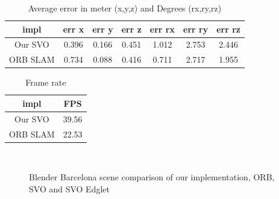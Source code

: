 \documentclass[11pt,a4paper,titlepage,oneside]{report}
\begin{document}
\begin{table}[H]
  \centering
  \begin{tabular}{|c|c|c|c|c|c|c|}
    impl & err x & err y & err z & err rx & err ry & err rz\\
    \hline
    Our SVO & 0.396 & 0.166 & 0.451 & 1.012 & 2.753 & 2.446\\
    ORB SLAM & 0.734 & 0.088 & 0.416 & 0.711 & 2.717 & 1.955
  \end{tabular}
\caption{Average error in meter (x,y,z) and Degrees (rx,ry,rz)}
\label{tab:barcelona_average}
\end{table}

\begin{table}[H]
  \centering
  \begin{tabular}{|c|c|}
  impl & FPS\\
  \hline
  Our SVO & 39.56\\
  ORB SLAM & 22.53
\end{tabular}
\caption{Frame rate}
\label{tab:barcelona_fps}
\end{table}

\begin{figure}[H]
	\centering
	\\
	\caption{Blender Barcelona scene comparison of our implementation, ORB, SVO and SVO Edglet}\label{fig:blender_barcelona_comp}
\end{figure}
\end{document}
